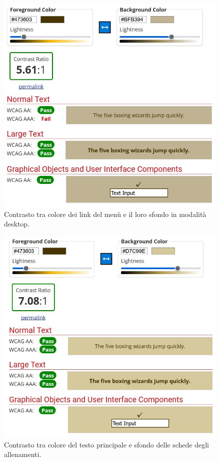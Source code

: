 \documentclass[a4paper]{article}
\begin{document}
	\begin{figure}[H]
		\centering
		\includegraphics[scale=0.35]{immagini/controllo-colori/light-mode/testo-principale_background-menu.JPG}
		\caption{Contrasto tra colore dei link del menù e il loro sfondo in modalità desktop.}
	\end{figure}

	\begin{figure}[H]
		\centering
		\includegraphics[scale=0.35]{immagini/controllo-colori/light-mode/testo-principale_sfondo-article-p.JPG}
		\caption{Contrasto tra colore del testo principale e sfondo delle schede degli allenamenti.}
	\end{figure}
\end{document}

